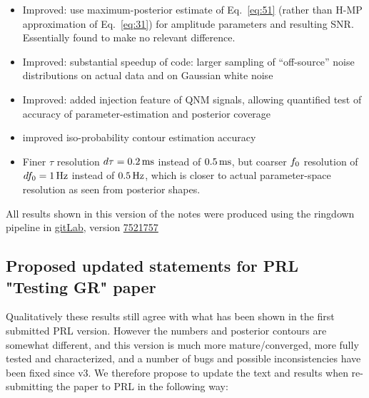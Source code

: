 \documentclass[aps,prd,onecolumn,notitlepage,nofootinbib,superscriptaddress,altaffilletter,floatfix]{revtex4-1}
\begin{document}
\begin{itemize}
\item Improved: use maximum-posterior estimate of Eq.~\eqref{eq:51} (rather than H-MP approximation of Eq.~\eqref{eq:31}) for amplitude parameters and
  resulting SNR. Essentially found to make no relevant difference.

\item Improved: substantial speedup of code: larger sampling of ``off-source'' noise distributions on actual data and on Gaussian white noise

\item Improved: added injection feature of QNM signals, allowing quantified test of accuracy of parameter-estimation and posterior coverage

\item improved iso-probability contour estimation accuracy

\item Finer $\tau$ resolution $d\tau=0.2\,\mathrm{ms}$ instead of $0.5\,\mathrm{ms}$, but coarser $f_0$ resolution of $df_0=1\,\mathrm{Hz}$ instead of $0.5\,\mathrm{Hz}$, which
  is closer to actual parameter-space resolution as seen from posterior shapes.

\end{itemize}

All results shown in this version of the notes were produced using the ringdown pipeline in
\href{https://git.ligo.org/BlackHole-QNM-Ringdown/Bayesian-QNM-PE-octave}{gitLab}, version
\href{https://git.ligo.org/BlackHole-QNM-Ringdown/Bayesian-QNM-PE-octave/commit/75217571c968955926e0399007e66ee019d950f7}{7521757}

\newpage
\subsection{Proposed updated statements for PRL "Testing GR" paper}
\label{sec:prop-updat-stat}

Qualitatively these results still agree with what has been shown in the first submitted PRL version.
However the numbers and posterior contours are somewhat different, and this version is much more mature/converged, more fully tested and
characterized, and a number of bugs and possible inconsistencies have been fixed since v3.
We therefore propose to update the text and results when re-submitting the paper to PRL in the following way:
\end{document}
